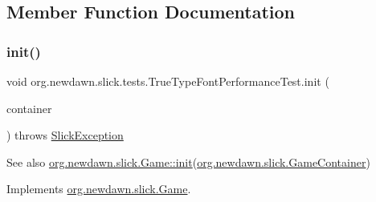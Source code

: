 \subsection{Member Function Documentation}
\mbox{\label{classorg_1_1newdawn_1_1slick_1_1tests_1_1_true_type_font_performance_test_a5b9af3a167f28a66f87e462ce698c2d7}} 
\subsubsection{\texorpdfstring{init()}{init()}}
{\footnotesize\ttfamily void org.\+newdawn.\+slick.\+tests.\+True\+Type\+Font\+Performance\+Test.\+init (\begin{DoxyParamCaption}\item[{\mbox{\hyperlink{classorg_1_1newdawn_1_1slick_1_1_game_container}{Game\+Container}}}]{container }\end{DoxyParamCaption}) throws \mbox{\hyperlink{classorg_1_1newdawn_1_1slick_1_1_slick_exception}{Slick\+Exception}}\hspace{0.3cm}{\ttfamily [inline]}}

\begin{DoxySeeAlso}{See also}
\mbox{\hyperlink{interfaceorg_1_1newdawn_1_1slick_1_1_game_ad2dd6affab08bb8fdb5fab0815957b7a}{org.\+newdawn.\+slick.\+Game\+::init}}(\mbox{\hyperlink{classorg_1_1newdawn_1_1slick_1_1_game_container}{org.\+newdawn.\+slick.\+Game\+Container}}) 
\end{DoxySeeAlso}


Implements \mbox{\hyperlink{interfaceorg_1_1newdawn_1_1slick_1_1_game_ad2dd6affab08bb8fdb5fab0815957b7a}{org.\+newdawn.\+slick.\+Game}}.


